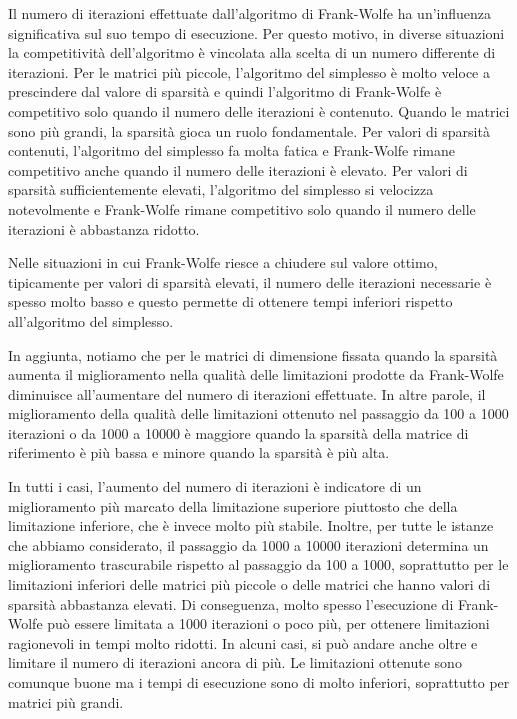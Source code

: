 Il numero di iterazioni effettuate dall'algoritmo di Frank-Wolfe ha un'influenza significativa sul suo tempo di
esecuzione. Per questo motivo, in diverse situazioni la competitività dell'algoritmo è vincolata alla scelta di un
numero differente di iterazioni. Per le matrici più piccole, l'algoritmo del simplesso è molto veloce a prescindere dal
valore di sparsità e quindi l'algoritmo di Frank-Wolfe è competitivo solo quando il numero delle iterazioni è
contenuto. Quando le matrici sono più grandi, la sparsità gioca un ruolo fondamentale. Per valori di sparsità contenuti,
l'algoritmo del simplesso fa molta fatica e Frank-Wolfe rimane competitivo anche quando il numero delle iterazioni è
elevato.
Per valori di sparsità sufficientemente elevati, l'algoritmo del simplesso si velocizza notevolmente e Frank-Wolfe
rimane competitivo solo quando il numero delle iterazioni è abbastanza ridotto.

Nelle situazioni in cui Frank-Wolfe riesce a chiudere sul valore ottimo, tipicamente per valori di sparsità elevati, il
numero delle iterazioni necessarie è spesso molto basso e questo permette di ottenere tempi inferiori rispetto
all'algoritmo del simplesso.

In aggiunta, notiamo che per le matrici di dimensione fissata quando la sparsità aumenta il
miglioramento nella qualità delle limitazioni prodotte da Frank-Wolfe diminuisce all'aumentare del numero di iterazioni
effettuate. In altre parole, il miglioramento della qualità delle limitazioni ottenuto nel passaggio da 100 a 1000 iterazioni o da 1000 a 10000 è
maggiore quando la sparsità della matrice di riferimento è più bassa e minore quando la sparsità è più alta.

In tutti i casi, l'aumento del numero di iterazioni è indicatore di un miglioramento più marcato della limitazione
superiore piuttosto che della limitazione inferiore, che è invece molto più stabile. Inoltre, per tutte le istanze che
abbiamo considerato, il passaggio da 1000 a 10000 iterazioni determina un miglioramento trascurabile rispetto al
passaggio da 100 a 1000, soprattutto per le limitazioni inferiori delle matrici più piccole o delle matrici che hanno
valori di sparsità abbastanza elevati. Di conseguenza, molto spesso l'esecuzione di Frank-Wolfe può essere limitata a
1000 iterazioni o poco più, per ottenere limitazioni ragionevoli in tempi molto ridotti. In alcuni casi, si può andare
anche oltre e limitare il numero di iterazioni ancora di più. Le limitazioni ottenute sono comunque buone ma i tempi di
esecuzione sono di molto inferiori, soprattutto per matrici più grandi.

